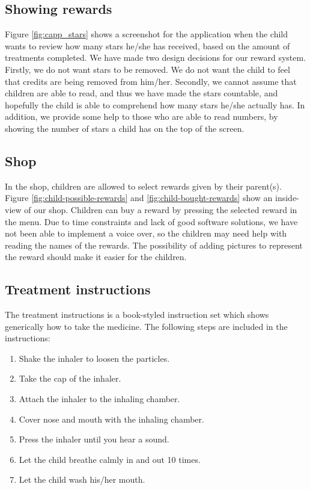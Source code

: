 \subsection{Showing rewards}
\label{sec:description-show-rewards}
Figure \ref{fig:capp_stars} shows a screenshot for the application when the child wants to review how many stars he/she has received, based on the amount of treatments completed. We have made two design decisions for our reward system. Firstly, we do not want stars to be removed. We do not want the child to feel that credits are being removed from him/her. Secondly, we cannot assume that children are able to read, and thus we have made the stars countable, and hopefully the child is able to comprehend how many stars he/she actually has. In addition, we provide some help to those who are able to read numbers, by showing the number of stars a child has on the top of the screen.      

\subsection{Shop}
\label{sec:description-shop}
In the shop, children are allowed to select rewards given by their parent(s). Figure \ref{fig:child-possible-rewards} and \ref{fig:child-bought-rewards} show an inside-view of our shop. Children can buy a reward by pressing the selected reward in the menu. Due to time constraints and lack of good software solutions, we have not been able to implement a voice over, so the children may need help with reading the names of the rewards. The possibility of adding pictures to represent the reward should make it easier for the children. 


\subsection{Treatment instructions}
\label{sec:description-instructions}
The treatment instructions is a book-styled instruction set which shows generically how to take the medicine. 
The following steps are included in the instructions: 
\begin{enumerate}
  \item Shake the inhaler to loosen the particles. 
  \item Take the cap of the inhaler.
  \item Attach the inhaler to the inhaling chamber.
  \item Cover nose and mouth with the inhaling chamber.
  \item Press the inhaler until you hear a sound.
  \item Let the child breathe calmly in and out 10 times.
  \item Let the child wash his/her mouth.
\end{enumerate} 


